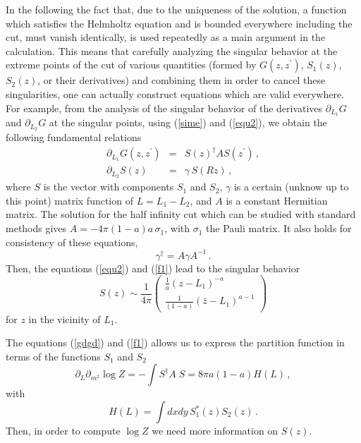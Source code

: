 \documentclass[a4paper]{article}
\begin{document}
In the following the fact that, due to the uniqueness of the solution, a function which satisfies the Helmholtz equation and is bounded everywhere including the cut, must vanish identically, is used repeatedly as a main argument in the calculation. This means that carefully analyzing the singular behavior at the extreme points of the cut of various quantities (formed by $G(z,z^\prime)$, $S_1(z)$, $S_2(z)$, or their derivatives) and combining them in order to cancel these singularities, one can actually construct equations which are valid everywhere.   
For example, from the analysis of the singular behavior of the derivatives $\partial_{L_1}G$ and $\partial_{L_2}G$ at the singular points, using (\ref{sime}) and (\ref{equ2}), we obtain the following fundamental relations
\begin{eqnarray}
\partial _{L_{1}}G(z,z^{\prime})&=&S(z)^{\dagger
}AS(z^{\prime})  \label{f1}\,,\\
\partial _{L_{2}}S(z)&=&\gamma \,S(Rz) \,, \label{a}
\end{eqnarray}
where $S$ is the vector with components $S_1$ and $S_2$, $\gamma $ is a certain (unknow up to this point) matrix function of $L=L_{1}-L_{2}$, and $A$ is a constant Hermitian matrix. The solution for the half infinity cut which can be studied with standard methods gives $A=-4\pi (1-a )a \,\sigma _{1}$, with $\sigma_1$  the Pauli matrix.
It also holds for consistency of these equations, 
\begin{equation}
\gamma ^{\dagger }=A\gamma A^{-1}\,. \label{129}
\end{equation}
Then, the equations (\ref{equ2}) and (\ref{f1}) lead to the singular behavior 
\begin{equation}
S(z)\sim \frac{1}{4\pi }\left(
\begin{array}{l}
\frac{1}{a }(z-L_{1})^{-a } \\
\frac{1}{(1-a )}(\bar{z}-L_{1})^{a -1}
\end{array}
\right)  \label{wr}
\end{equation}
for $z$ in the vicinity of $L_{1}$. 

The equations (\ref{gdgd}) and (\ref{f1}) allows us to express the partition function in terms of the functions $S_1$ and $S_2$
\begin{equation}
\partial _{L}\partial _{m^{2}}\log Z=-\int S^{\dagger
}A\;S=8\pi a \left( 1-a \right)H(L)\,,\label{partfunc}
\end{equation}
with
\begin{equation}
H(L) =\int dxdy\,S_{1}^{*}(z)S_{2}(z) \,. \label{hh}
\end{equation}
Then, in order to compute $\log Z$ we need more information on $S(z)$.
\end{document}
